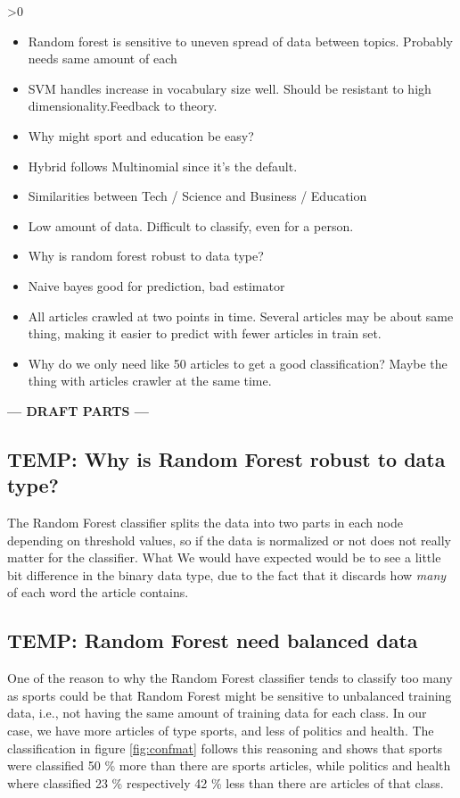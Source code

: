 \ifnum\printdraft>0
	\begin{itemize}
		\item Random forest is sensitive to uneven spread of data between topics. Probably needs same amount of each
		\item SVM handles increase in vocabulary size well. Should be resistant to high dimensionality.Feedback to theory.
		\item Why might sport and education be easy?
		\item Hybrid follows Multinomial since it's the default.
		\item Similarities between Tech / Science and Business / Education
		\item Low amount of data. Difficult to classify, even for a person.
		\item Why is random forest robust to data type?
		\item Naive bayes good for prediction, bad estimator
		\item All articles crawled at two points in time. Several articles may be about same thing, making it easier to predict with fewer articles in train set.
		\item Why do we only need like 50 articles to get a good classification? Maybe the thing with articles crawler at the same time.
	\end{itemize}
\else
\begin{center}
	\textbf{--- DRAFT PARTS ---}
\end{center}
\fi

\subsection{TEMP: Why is Random Forest robust to data type?} %
\label{sub:temp_why_is_random_forest_robust_to_data_type_}
The Random Forest classifier splits the data into two parts in each node depending on threshold values, so if the data is normalized or not does not really matter for the classifier. What We would have expected would be to see a little bit difference in the binary data type, due to the fact that it discards how \emph{many} of each word the article contains.

\subsection{TEMP: Random Forest need balanced data} %
\label{sub:temp_random_forest_need_balanced_data}
One of the reason to why the Random Forest classifier tends to classify too many as sports could be that Random Forest might be sensitive to unbalanced training data, i.e., not having the same amount of training data for each class. In our case, we have more articles of type sports, and less of politics and health. The classification in figure \ref{fig:confmat} follows this reasoning and shows that sports were classified 50 \% more than there are sports articles, while politics and health where classified 23 \% respectively 42 \% less than there are articles of that class.

